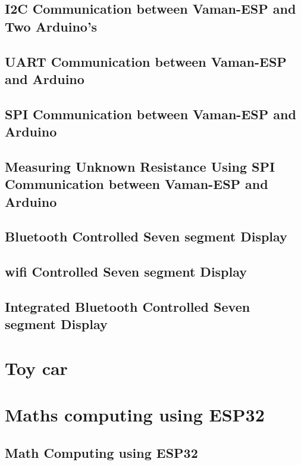 \documentclass[11pt]{book}
\begin{document}
\section{I2C Communication between Vaman-ESP and Two Arduino's}

\section{UART Communication between Vaman-ESP and Arduino}

\section{SPI Communication between Vaman-ESP and Arduino}

\section{Measuring Unknown Resistance Using SPI Communication between Vaman-ESP and Arduino}

\section{Bluetooth Controlled Seven segment Display}

\section{wifi Controlled Seven segment Display}

\section{Integrated Bluetooth Controlled Seven segment Display}

\chapter{Toy car}

\chapter{Maths computing using ESP32}
\section{Math Computing using ESP32}

\backmatter
\appendix

\latexprintindex
\end{document}
